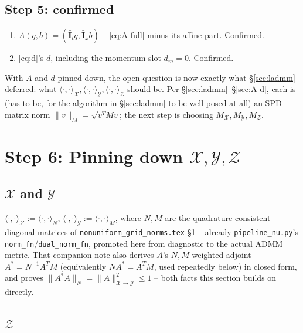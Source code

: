 \documentclass[11pt]{article}
\newcommand{\code}[1]{\texttt{#1}}
\begin{document}
\subsection*{Step 5: confirmed}

\begin{enumerate}
  \item $A(q,b)=(\bar{\mathbf I}_t q,\bar{\mathbf I}_x b)$ -- \eqref{eq:A-full} minus its
        affine part. Confirmed.
  \item \eqref{eq:d}'s $d$, including the momentum slot $d_m=0$. Confirmed.
\end{enumerate}

With $A$ and $d$ pinned down, the open question is now exactly what \S\ref{sec:ladmm}
deferred: what $\langle\cdot,\cdot\rangle_\mathcal{X},\langle\cdot,\cdot\rangle_\mathcal{Y},
\langle\cdot,\cdot\rangle_\mathcal{Z}$ should be. Per \S\ref{sec:ladmm}--\S\ref{sec:A-d},
each is (has to be, for the algorithm in \S\ref{sec:ladmm} to be well-posed at all) an SPD
matrix norm $\|v\|_M=\sqrt{v^TMv}$; the next step is choosing $M_\mathcal{X},M_\mathcal{Y},
M_\mathcal{Z}$.

\section{Step 6: Pinning down $\mathcal X,\mathcal Y,\mathcal Z$}
\label{sec:norms-pinned}

\subsection{$\mathcal X$ and $\mathcal Y$}

$\langle\cdot,\cdot\rangle_\mathcal X:=\langle\cdot,\cdot\rangle_N$,
$\langle\cdot,\cdot\rangle_\mathcal Y:=\langle\cdot,\cdot\rangle_M$, where $N,M$ are the
quadrature-consistent diagonal matrices of \code{nonuniform\_grid\_norms.tex} \S1 --
already \code{pipeline\_nu.py}'s \code{norm\_fn}/\code{dual\_norm\_fn}, promoted here
from diagnostic to the actual ADMM metric. That companion note also derives $A$'s
$N,M$-weighted adjoint $A^*=N^{-1}A^TM$ (equivalently $NA^*=A^TM$, used repeatedly below)
in closed form, and proves $\|A^*A\|_N=\|A\|_{\mathcal X\to\mathcal Y}^2\le1$ -- both facts
this section builds on directly.

\subsection{$\mathcal Z$}
\end{document}
